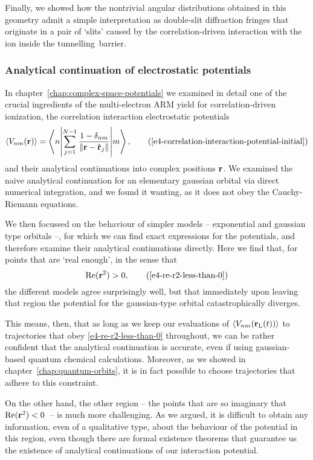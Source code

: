 Finally, we showed how the nontrivial angular distributions obtained in this geometry admit a simple interpretation as double-slit diffraction fringes that originate in a pair of `slits' caused by the correlation-driven interaction with the ion inside the tunnelling~barrier.


\subsubsection{Analytical continuation of electrostatic potentials}
In chapter~\ref{chap:complex-space-potentials} we examined in detail one of the crucial ingredients of the multi-electron ARM yield for correlation-driven ionization, the correlation interaction electrostatic potentials
\begin{equation}
\Vnm{\vbr}=\matrixel**{n}{\sum_{j=1}^{N-1} \frac{1-\delta_{nm}}{\| \vbr - \hat{\vbr}_j\|} }{m}
,
\backtag{e4-correlation-interaction-potential-initial}
\end{equation}
and their analytical continuations into complex positions $\vb{r}$. We examined the naive analytical continuation for an elementary gaussian orbital via direct numerical integration, and we found it wanting, as it does not obey the Cauchy-Riemann equations.

We then focussed on the behaviour of simpler models -- exponential and gaussian type orbitals --, for which we can find exact expressions for the potentials, and therefore examine their analytical continuations directly. Here we find that, for points that are `real enough', in the sense that
\begin{equation}
\Re(\vbr^2)>0,
\backtag{e4-re-r2-less-than-0}
\end{equation}
the different models agree surprisingly well, but that immediately upon leaving that region the potential for the gaussian-type orbital catastrophically diverges.

This means, then, that as long as we keep our evaluations of $\left\langle V_{nm}\mathopen{}\left( \vb{r}_\mathrm{L}(t) \right)\mathclose{} \right\rangle$ to trajectories that obey \eqref{e4-re-r2-less-than-0} throughout, we can be rather confident that the analytical continuation is accurate, even if using gaussian-based quantum chemical calculations. Moreover, as we showed in chapter~\ref{chap:quantum-orbits}, it is in fact possible to choose trajectories that adhere to this constraint.

On the other hand, the other region -- the points that are so imaginary that $\Re(\vb{r}^2)<0$~-- is much more challenging. As we argued, it is difficult to obtain any information, even of a qualitative type, about the behaviour of the potential in this region, even though there are formal existence theorems that guarantee us the existence of analytical continuations of  our interaction potential.



